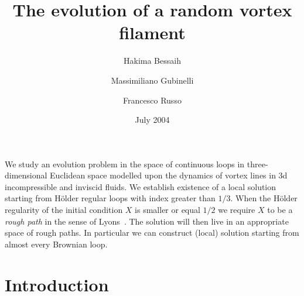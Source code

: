 \documentclass[a4paper,12pt,reqno]{amsart}
\begin{document}
\title{The evolution of a random  vortex filament}
\date{July 2004}
\author{Hakima Bessaih \and Massimiliano Gubinelli \and Francesco Russo}
\address{Dipartimento di  Matematica Applicata ``U.Dini''\\
Universit\`a di Pisa\\
Via Bonanno Pisano, 25 bis - 56125 Pisa, ITALIA }
\address{Institue Galil\'ee, Mathematiques\\
Universit\'e Paris 13\\
99, av. J.-B. Cl\'ement - F-93430 Villetaneuse, FRANCE }
\address{Institue Galil\'ee, Mathematiques\\
Universit\'e Paris 13\\
99, av. J.-B. Cl\'ement - F-93430 Villetaneuse, FRANCE }

\abstract
We study an evolution problem in the space of continuous loops in
three-dimensional Euclidean space modelled upon the dynamics of vortex
lines in 3d incompressible and inviscid fluids. We establish existence
of a local solution starting from H\"older regular loops with index
greater than $1/3$.  When the H\"older regularity of the initial
condition $X$ is smaller or equal $1/2$ we require $X$ to be a
\emph{rough path} in the sense of Lyons~\cite{Lyons,LyonsBook}. The solution
will then live in an appropriate space of rough paths. In particular
we can construct (local) solution starting from almost every Brownian loop.
\endabstract
\maketitle

\section{Introduction}
\end{document}
